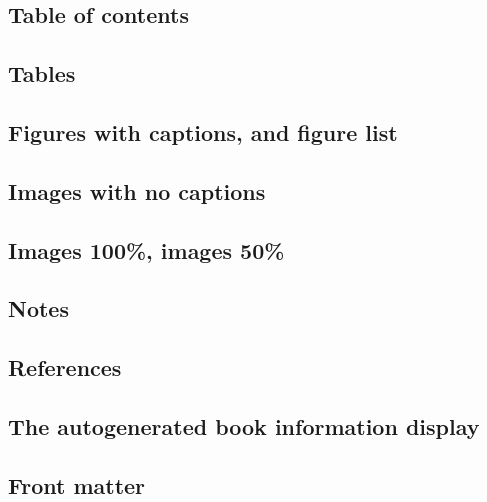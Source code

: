 \documentclass{article}
\begin{document}
\subsection{Table of contents}\label{H1035282}



\subsection{Tables}\label{H2657285}



\subsection{Figures with captions, and figure list}\label{H2649195}



\subsection{Images with no captions}\label{H3111694}



\subsection{Images 100\%, images 50\%}\label{H1834260}



\subsection{Notes}\label{H8583149}



\subsection{References}\label{H6587634}



\subsection{The autogenerated book information display}\label{H2658073}



\subsection{Front matter}\label{H2520043}
\end{document}
